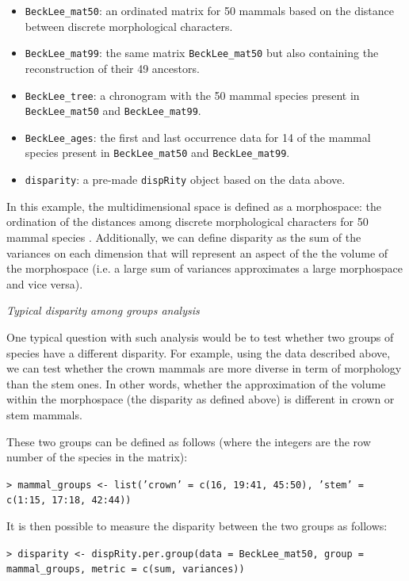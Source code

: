 \documentclass[12pt,letterpaper]{article}
\renewcommand{\subsection}[1]{%
\bigskip
\begin{center}
\begin{large}
\normalfont\itshape #1
\end{large}
\end{center}}
\newcommand{\disp}{\texttt{dispRity} }
\begin{document}
\begin{itemize}
    \item \texttt{BeckLee\_mat50}: an ordinated matrix for 50 mammals based on the distance between discrete morphological characters.
    \item \texttt{BeckLee\_mat99}: the same matrix \texttt{BeckLee\_mat50} but also containing the reconstruction of their 49 ancestors.
    \item \texttt{BeckLee\_tree}: a chronogram with the 50 mammal species present in \texttt{BeckLee\_mat50} and \texttt{BeckLee\_mat99}.
    \item \texttt{BeckLee\_ages}: the first and last occurrence data for 14 of the mammal species present in \texttt{BeckLee\_mat50} and \texttt{BeckLee\_mat99}.
    \item \texttt{disparity}: a pre-made \disp object based on the data above.
\end{itemize}

In this example, the multidimensional space is defined as a morphospace: the ordination of the distances among discrete morphological characters for 50 mammal species \citep[from][]{beckancient2014}.
Additionally, we can define disparity as the sum of the variances on each dimension \citep{Wills1994} that will represent an aspect of the the volume of the morphospace (i.e. a large sum of variances approximates a large morphospace and vice versa).

\subsection{Typical disparity among groups analysis}
One typical question with such analysis would be to test whether two groups of species have a different disparity.
For example, using the data described above, we can test whether the crown mammals are more diverse in term of morphology than the stem ones.
In other words, whether the approximation of the volume within the morphospace (the disparity as defined above) is different in crown or stem mammals.

\noindent These two groups can be defined as follows (where the integers are the row number of the species in the matrix):

\noindent \texttt{> mammal\_groups <- list('crown' = c(16, 19:41, 45:50), 'stem' = c(1:15, 17:18, 42:44))}

\noindent It is then possible to measure the disparity between the two groups as follows:

\noindent \texttt{> disparity <- dispRity.per.group(data = BeckLee\_mat50, group = mammal\_groups, metric = c(sum, variances))}
\end{document}
